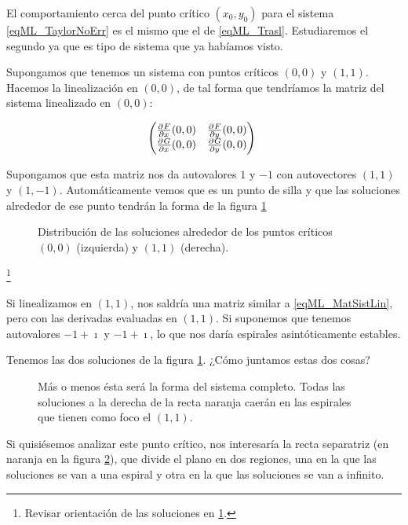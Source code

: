 El comportamiento cerca del punto crítico $(x_0, y_0)$ para el sistema \eqref{eqML_TaylorNoErr} es el mismo que el de \eqref{eqML_Trasl}. Estudiaremos el segundo ya que es tipo de sistema que ya habíamos visto.

Supongamos que tenemos un sistema con puntos críticos $(0,0)$ y $(1,1)$. Hacemos la linealización en $(0,0)$, de tal forma que tendríamos la matriz del sistema linealizado en $(0,0)$:

\begin{equation} \label{eqML_MatSistLin} \begin{pmatrix}
\pd{F}{x}(0,0) & \pd{F}{y}(0,0) \\
\pd{G}{x}(0,0) & \pd{G}{y}(0,0)
\end{pmatrix} \end{equation}

Supongamos que esta matriz nos da autovalores $1$ y $-1$ con autovectores $(1,1)$ y $(1,-1)$. Automáticamente vemos que es un punto de silla y que las soluciones alrededor de ese punto tendrán la forma de la figura \ref{imgML_Silla}

\begin{figure}[hbtp]
\caption{Distribución de las soluciones alrededor de los puntos críticos $(0,0)$ (izquierda) y $(1,1)$ (derecha).}
\label{imgML_Silla}
\end{figure}

\footnote{Revisar orientación de las soluciones en \ref{imgML_Silla}.}

Si linealizamos en $(1,1)$, nos saldría una matriz similar a \eqref{eqML_MatSistLin}, pero con las derivadas evaluadas en $(1,1)$. Si suponemos que tenemos autovalores $-1+\imath$ y $-1+\imath$, lo que nos daría espirales asintóticamente estables.

Tenemos las dos soluciones de la figura \ref{imgML_Silla}. ¿Cómo juntamos estas dos cosas?

\begin{figure}[hbtp]
\caption{Más o menos ésta será la forma del sistema completo. Todas las soluciones a la derecha de la recta naranja caerán en las espirales que tienen como foco el $(1,1)$.}
\label{imgMLSoluciones}
\end{figure}

Si quisiésemos analizar este punto crítico, nos interesaría la recta separatriz (en naranja en la figura \ref{imgMLSoluciones}), que divide el plano en dos regiones, una en la que las soluciones se van a una espiral y otra en la que las soluciones se van a infinito.

